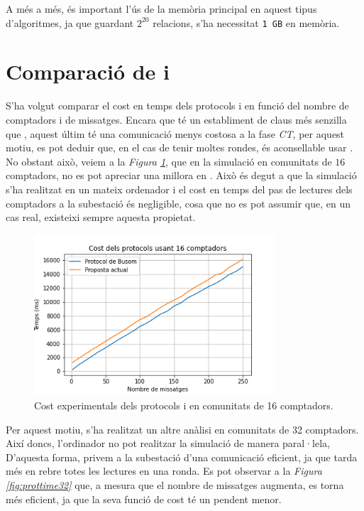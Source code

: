 A més a més, és important l'ús de la memòria principal en aquest tipus d'algoritmes, ja que guardant $2^{20}$ relacions, s'ha necessitat \texttt{1 GB} en memòria.
\section{Comparació de \cite{recsi} i \cite{busom}}
S'ha volgut comparar el cost en temps dels protocols \cite{recsi} i \cite{busom} en funció del nombre de comptadors i de missatges. Encara que \cite{busom} té un establiment de claus més senzilla que \cite{recsi}, aquest últim té una comunicació menys costosa a la fase \textit{CT}, per aquest motiu, es pot deduir que, en el cas de tenir moltes rondes, és aconsellable usar \cite{recsi}. No obstant això, veiem a la \textit{Figura \ref{fig:prottime16}}, que en la simulació en comunitats de $16$ comptadors, no es pot apreciar una millora en \cite{recsi}. Això és degut a que la simulació s'ha realitzat en un mateix ordenador i el cost en temps del pas de lectures dels comptadors a la subestació és negligible, cosa que no es pot assumir que, en un cas real, existeixi sempre aquesta propietat.
\begin{figure}[H]
	\centering
	\includegraphics[width=9cm]{imgs/cost/16compt.png}
	\caption{Cost experimentals dels protocols \cite{recsi} i \cite{busom} en comunitats de 16 comptadors.}
	\label{fig:prottime16}
\end{figure}
\newpage
Per aquest motiu, s'ha realitzat un altre anàlisi en comunitats de 32 comptadors. Així doncs, l'ordinador no pot realitzar la simulació de manera paral·lela, D'aquesta forma, privem a la subestació d'una comunicació eficient, ja que tarda més en rebre totes les lectures en una ronda. Es pot observar a la \textit{Figura \ref{fig:prottime32}} que, a mesura que el nombre de missatges augmenta, \cite{recsi} es torna més eficient, ja que la seva funció de cost té un pendent menor.
